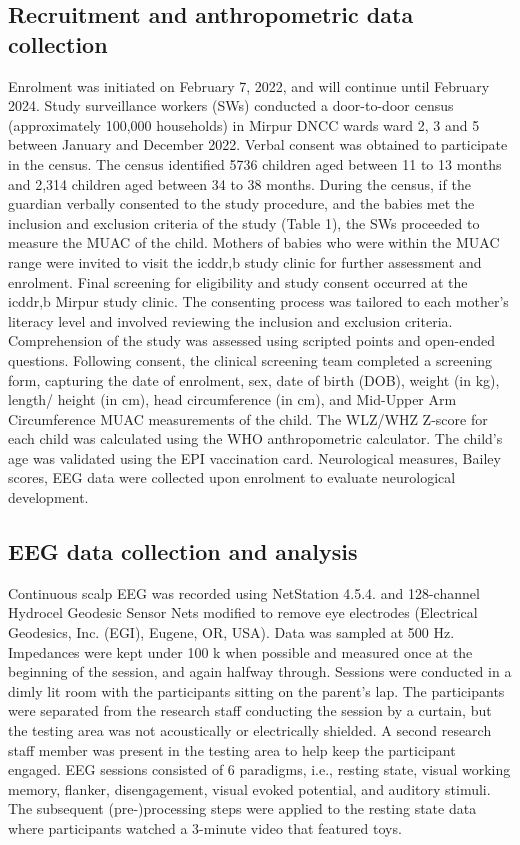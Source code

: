 \documentclass{article}
\begin{document}
\subsection*{Recruitment and anthropometric data collection}
Enrolment was initiated on February 7, 2022, and will continue until February 2024.
Study surveillance workers (SWs) conducted a door-to-door census (approximately 100,000 households) in Mirpur DNCC wards ward 2, 3 and 5 between January and December 2022.
Verbal consent was obtained to participate in the census.
The census identified 5736 children aged between 11 to 13 months and 2,314 children aged between 34 to 38 months.
During the census, if the guardian verbally consented to the study procedure, and the babies met the inclusion and exclusion criteria of the study (Table 1), the SWs proceeded to measure the \gls{MUAC} of the child.
Mothers of babies who were within the \gls{MUAC} range were invited to visit the icddr,b study clinic for further assessment and enrolment.
Final screening for eligibility and study consent occurred at the icddr,b Mirpur study clinic.
The consenting process was tailored to each mother's literacy level and involved reviewing the inclusion and exclusion criteria.
Comprehension of the study was assessed using scripted points and open-ended questions.
Following consent, the clinical screening team completed a screening form, capturing the date of enrolment, sex, date of birth (DOB), weight (in kg), length/ height (in cm), head circumference (in cm), and Mid-Upper Arm Circumference \gls{MUAC} measurements of the child.
The \gls{WLZ/WHZ} Z-score for each child was calculated using the WHO anthropometric calculator.
The child's age was validated using the EPI vaccination card.
Neurological measures, Bailey scores, EEG data were collected upon enrolment to evaluate neurological development.

\subsection*{EEG data collection and analysis}
Continuous scalp EEG was recorded using NetStation 4.5.4. and 128-channel Hydrocel Geodesic Sensor Nets modified to remove eye electrodes (Electrical Geodesics, Inc. (EGI), Eugene, OR, USA).
Data was sampled at 500 Hz.
Impedances were kept under 100 k \textomega{} when possible and measured once at the beginning of the session, and again halfway through.
Sessions were conducted in a dimly lit room with the participants sitting on the parent’s lap.
The participants were separated from the research staff conducting the session by a curtain, but the testing area was not acoustically or electrically shielded.
A second research staff member was present in the testing area to help keep the participant engaged.
EEG sessions consisted of 6 paradigms, i.e., resting state, visual working memory, flanker, disengagement, visual evoked potential, and auditory stimuli.
The subsequent (pre-)processing steps were applied to the resting state data where participants watched a 3-minute video that featured toys.
\end{document}
